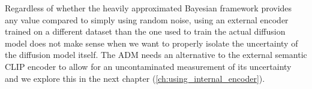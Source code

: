 Regardless of whether the heavily approximated Bayesian framework provides any value compared to simply using random noise, using an external encoder trained on a different dataset than the one used to train the actual diffusion model does not make sense when we want to properly isolate the uncertainty of the diffusion model itself.
The \acs{ADM} needs an alternative to the external semantic \acs{CLIP} encoder to allow for an uncontaminated measurement of its uncertainty and we explore this in the next chapter (\autoref{ch:using_internal_encoder}).